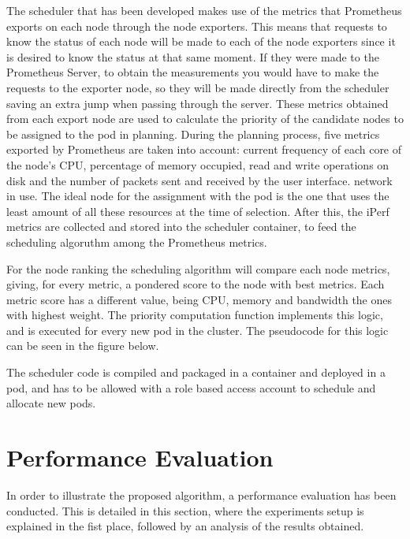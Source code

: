 \documentclass[conference]{IEEEtran}
\begin{document}
The scheduler that has been developed makes use of the metrics that Prometheus exports on each node through the node exporters.
This means that requests to know the status of each node will be made to each of the node exporters since it is desired to know
the status at that same moment. If they were made to the Prometheus Server, to obtain the measurements you would have to make the 
requests to the exporter node, so they will be made directly from the scheduler saving an extra jump when passing through the server.
These metrics obtained from each export node are used to calculate the priority of the candidate nodes to be assigned to the pod
in planning. During the planning process, five metrics exported by Prometheus are taken into account: current frequency of each core
of the node's CPU, percentage of memory occupied, read and write operations on disk and the number of packets sent and received by the
user interface. network in use. The ideal node for the assignment with the pod is the one that uses the least amount of all these
resources at the time of selection. After this, the iPerf metrics are collected and stored into the scheduler container, to feed
the scheduling algoruthm among the Prometheus metrics.

For the node ranking the scheduling algorithm will compare each node metrics, giving, for every metric, a pondered score to the node
with best metrics. Each metric score has a different value, being CPU, memory and bandwidth the ones with highest weight.
The priority computation function implements this logic, and is executed for every new pod in the cluster.
The pseudocode for this logic can be seen in the figure below.

The scheduler code is compiled and packaged in a container and deployed in a pod, and has to be allowed with a role based access account to schedule
and allocate new pods.


\section{Performance Evaluation}\label{sec:eval}

In order to illustrate the proposed algorithm, a performance evaluation has been conducted. This is detailed in this section, where the experiments setup is explained in the fist place, followed by an analysis of the results obtained. 


\end{document}
